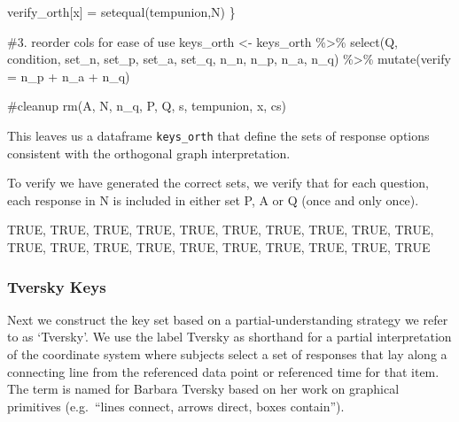 \documentclass[
  letterpaper,
  DIV=11,
  numbers=noendperiod]{scrreprt}
\newenvironment{Shaded}{\begin{snugshade}}{\end{snugshade}}
\newcommand{\AttributeTok}[1]{\textcolor[rgb]{0.40,0.45,0.13}{#1}}
\newcommand{\CommentTok}[1]{\textcolor[rgb]{0.37,0.37,0.37}{#1}}
\newcommand{\FunctionTok}[1]{\textcolor[rgb]{0.28,0.35,0.67}{#1}}
\newcommand{\NormalTok}[1]{\textcolor[rgb]{0.00,0.23,0.31}{#1}}
\newcommand{\OtherTok}[1]{\textcolor[rgb]{0.00,0.23,0.31}{#1}}
\newcommand{\SpecialCharTok}[1]{\textcolor[rgb]{0.37,0.37,0.37}{#1}}
\begin{document}
\begin{Shaded}
\begin{Highlighting}[]
\NormalTok{  verify\_orth[x] }\OtherTok{=} \FunctionTok{setequal}\NormalTok{(tempunion,N)}
\NormalTok{\}}

\CommentTok{\#3. reorder cols for ease of use}
\NormalTok{keys\_orth }\OtherTok{\textless{}{-}}\NormalTok{ keys\_orth }\SpecialCharTok{\%\textgreater{}\%} \FunctionTok{select}\NormalTok{(Q, condition, set\_n, set\_p, set\_a, set\_q, n\_n, n\_p, n\_a, n\_q) }\SpecialCharTok{\%\textgreater{}\%} \FunctionTok{mutate}\NormalTok{(}\AttributeTok{verify =}\NormalTok{ n\_p }\SpecialCharTok{+}\NormalTok{ n\_a }\SpecialCharTok{+}\NormalTok{ n\_q)}


\CommentTok{\#cleanup}
\FunctionTok{rm}\NormalTok{(A, N, n\_q, P, Q, s, tempunion, x, cs)}
\end{Highlighting}
\end{Shaded}

This leaves us a dataframe \texttt{keys\_orth} that define the sets of
response options consistent with the orthogonal graph interpretation.

To verify we have generated the correct sets, we verify that for each
question, each response in N is included in either set P, A or Q (once
and only once).

TRUE, TRUE, TRUE, TRUE, TRUE, TRUE, TRUE, TRUE, TRUE, TRUE, TRUE, TRUE,
TRUE, TRUE, TRUE, TRUE, TRUE, TRUE, TRUE, TRUE

\hypertarget{tversky-keys}{%
\subsubsection{Tversky Keys}\label{tversky-keys}}

Next we construct the key set based on a partial-understanding strategy
we refer to as `Tversky'. We use the label Tversky as shorthand for a
partial interpretation of the coordinate system where subjects select a
set of responses that lay along a connecting line from the referenced
data point or referenced time for that item. The term is named for
Barbara Tversky based on her work on graphical primitives (e.g.~``lines
connect, arrows direct, boxes contain'').
\end{document}
